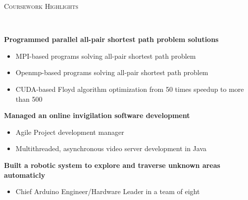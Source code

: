 \documentclass[a4paper, 12pt]{article}
\newenvironment{changemargin}[2]{%
  \begin{list}{}{%
      \setlength{\topsep}{0pt}%
      \setlength{\leftmargin}{#1}%
      \setlength{\rightmargin}{#2}%
      \setlength{\listparindent}{\parindent}%
      \setlength{\itemindent}{\parindent}%
      \setlength{\parsep}{\parskip}%
    }%
  \item[]}{\end{list}
}
\newcommand{\lineover}{
  \begin{changemargin}{-0.05in}{-0.05in}
    \vspace*{-8pt}
    \hrulefill \\
    \vspace*{-2pt}
  \end{changemargin}
}
\newcommand{\header}[1]{
  \begin{changemargin}{-0.6in}{-0.6in}
    \fontsize{15}{15}\scshape{#1}\\
    \lineover
    \vspace*{-4pt}
  \end{changemargin}
}
\newenvironment{body}
{
\vspace*{-16pt}
\begin{changemargin}{-0.25in}{-0.5in}
}
{
\end{changemargin}
}
\begin{document}
%
%
%
%
\header{Coursework Highlights}
\begin{body}
  \vspace{14pt}
  \textbf{Programmed parallel all-pair shortest path problem solutions}\\
  \vspace*{-6pt}
    \begin{itemize} \itemsep -0pt \small
        \item MPI-based programs solving all-pair shortest path problem
        \item Openmp-based programs solving all-pair shortest path problem
        \item CUDA-based Floyd algorithm optimization from 50 times speedup to more than 500
    \end{itemize}
  \textbf{Managed an online invigilation software development}\\
  \vspace*{-6pt}
    \begin{itemize} \itemsep -0pt \small
        \item Agile Project development manager
        \item Multithreaded, asynchronous video server development in Java
    \end{itemize}
  \textbf{Built a robotic system to explore and traverse unknown areas automaticly}\\
  \vspace*{-6pt}
    \begin{itemize} \itemsep -0pt \small
        \item Chief Arduino Engineer/Hardware Leader in a team of eight

\end{itemize}
\end{body}
\end{document}
